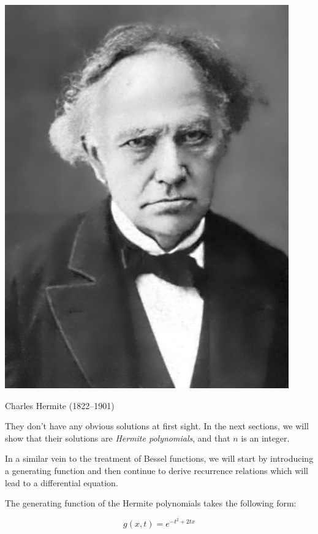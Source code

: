 \begin{marginfigure}[-4.3cm]
\includegraphics{hermite/figures/c_hermite}
\caption{Charles Hermite (1822–1901)}
\end{marginfigure}

They don't have any obvious solutions at first sight. In the next sections, we will show that their solutions are \emph{Hermite polynomials}, and that $n$ is an integer.

In a similar vein to the treatment of Bessel functions, we will start by introducing a generating function and then continue to derive recurrence relations which will lead to a differential equation.


\pagebreak



The generating function of the Hermite polynomials takes the following form:

\begin{equation}
g(x,t) = e^{-t^2 + 2tx} \label{eq-gen-hermite}
\end{equation}

